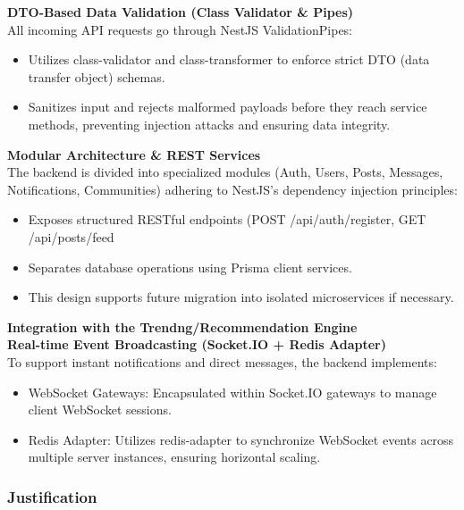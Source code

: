 \medskip\noindent\textbf{DTO-Based Data Validation (Class Validator \& Pipes)}\\[2pt]

All incoming API requests go through NestJS ValidationPipes:
\begin{itemize}
  \item Utilizes class-validator and class-transformer to enforce strict DTO (data transfer object) schemas.
  \item Sanitizes input and rejects malformed payloads before they reach service methods, preventing injection attacks and ensuring data integrity.
\end{itemize}

\medskip\noindent\textbf{Modular Architecture \& REST Services}\\[2pt]

The backend is divided into specialized modules (Auth, Users, Posts, Messages, Notifications, Communities) adhering to NestJS's dependency injection principles:
\begin{itemize}
  \item Exposes structured RESTful endpoints (POST /api/auth/register, GET /api/posts/feed
  \item Separates database operations using Prisma client services.
  \item This design supports future migration into isolated microservices if necessary.
\end{itemize}

\medskip\noindent\textbf{Integration with the Trendng/Recommendation Engine}\\[2pt]

\medskip\noindent\textbf{Real-time Event Broadcasting (Socket.IO + Redis Adapter)}\\[2pt]

To support instant notifications and direct messages, the backend implements:
\begin{itemize}
  \item WebSocket Gateways: Encapsulated within Socket.IO gateways to manage client WebSocket sessions.
  \item Redis Adapter: Utilizes redis-adapter to synchronize WebSocket events across multiple server instances, ensuring horizontal scaling.
\end{itemize}

\subsubsection{Justification}

